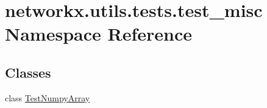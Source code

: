 \hypertarget{namespacenetworkx_1_1utils_1_1tests_1_1test__misc}{}\section{networkx.\+utils.\+tests.\+test\+\_\+misc Namespace Reference}
\label{namespacenetworkx_1_1utils_1_1tests_1_1test__misc}
\subsection*{Classes}
\begin{DoxyCompactItemize}
\item 
class \hyperlink{classnetworkx_1_1utils_1_1tests_1_1test__misc_1_1TestNumpyArray}{Test\+Numpy\+Array}
\end{DoxyCompactItemize}
